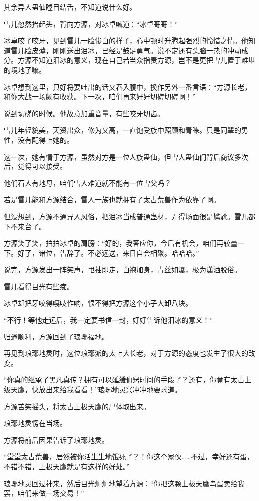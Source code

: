 \begin{this_body}
其余异人蛊仙瞠目结舌，不知道说什么好。

雪儿忽然抬起头，背向方源，对冰卓喊道：“冰卓哥哥！”

冰卓咬了咬牙，见到雪儿一脸惨白的样子，心中顿时升腾起强烈的怜惜之情。他知道雪儿脸皮薄，刚刚送出泪冰，已经是鼓足勇气。说不定还有头脑一热的冲动成分。方源不知道泪冰的意义，现在自己若当众指责方源，岂不是更把雪儿置于难堪的境地了嘛。

冰卓想到这里，只好将要吐出的话又吞入腹中，换作另外一番言语：“方源长老，和你大战一场颇有收获。下一次，咱们再来好好切磋切磋啊！”

说到切磋的时候。他故意加重音量，有些咬牙切齿。

雪儿年轻貌美，天资出众，修为又高，一直饱受族中照顾和青睐。只是同辈的男性，没有配得上她的。

这一次，她有情于方源，虽然对方是一位人族蛊仙，但雪人蛊仙们背后商议多次后，觉得可以接受。

他们石人有地母，咱们雪人难道就不能有一位雪父吗？

若是雪儿能和方源结合，雪人一族也就拥有了太古荒兽作为依靠了啊。

但没想到，方源不通异人风俗，把泪冰当成普通蛊材，弄得场面很是尴尬。雪儿都下不来台了。

方源笑了笑，拍拍冰卓的肩膀：“好的，我答应你，今后有机会，咱们再较量一下。好了，诸位，告辞了。不必远送，来日自会相聚。哈哈哈。”

说完，方源发出一阵笑声，甩袖即走，白袍加身，青丝如瀑，极为潇洒脱俗。

雪儿看得目光有些痴。

冰卓却把牙咬得嘎吱作响，恨不得把方源这个小子大卸八块。

“不行！等他走远后，我一定要书信一封，好好告诉他泪冰的意义！”

归途顺利，方源回到了琅琊福地。

再见到琅琊地灵时，这位琅琊派的太上大长老，对于方源的态度也发生了很大的改变。

“你真的继承了黑凡真传？拥有可以延缓仙窍时间的手段了？还有，你竟有太古上级天鹰，快放出来给我看看！”琅琊地灵兴冲冲地要求道。

方源苦笑摇头，将太古上极天鹰的尸体取出来。

琅琊地灵愣在当场。

方源将前后因果告诉了琅琊地灵。

“堂堂太古荒兽，居然被你活生生地饿死了？！你这个家伙……不过，幸好还有蛋，不错不错，上极天鹰就是有这样的好处。”

琅琊地灵回过神来，然后目光炯炯地望着方源：“你把这颗上极天鹰鸟蛋卖给我罢，咱们来做一场交易！”


\end{this_body}
